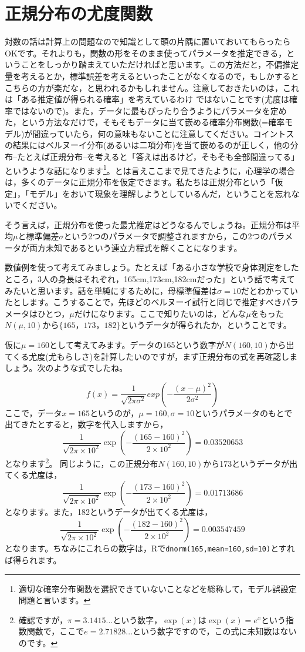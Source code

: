 \documentclass{ltjsbook}
\begin{document}
\section{正規分布の尤度関数}
対数の話は計算上の問題なので知識として頭の片隅に置いておいてもらったらOKです。それよりも，関数の形をそのまま使ってパラメータを推定できる，ということをしっかり踏まえていただければと思います。この方法だと，不偏推定量を考えるとか，標準誤差を考えるといったことがなくなるので，もしかするとこちらの方が楽だな，と思われるかもしれません。注意しておきたいのは，これは「ある推定値が得られる確率」を考えているわけ
ではないことです(尤度は確率ではないので)。また，データに最もぴったり合うようにパラメータを定めた，という方法なだけで，そもそもデータに当て嵌める確率分布関数(=確率モデル)が間違っていたら，何の意味もないことに注意してください。コイントスの結果にはベルヌーイ分布(あるいは二項分布)を当て嵌めるのが正しく，他の分布--たとえば正規分布--を考えると「答えは出るけど，そもそも全部間違ってる」というような話になります\footnote{適切な確率分布関数を選択できていないことなどを総称して，モデル誤設定問題と言います。}。とは言えここまで見てきたように，心理学の場合は，多くのデータに正規分布を仮定できます。私たちは正規分布という「仮定」，「モデル」をおいて現象を理解しようとしているんだ，ということを忘れないでください。

そう言えば，正規分布を使った最尤推定はどうなるんでしょうね。正規分布は平均$\mu$と標準偏差$\sigma$という2つのパラメータで調整されますから，この2つのパラメータが両方未知であるという連立方程式を解くことになります。

数値例を使って考えてみましょう。たとえば「ある小さな学校で身体測定をしたところ，3人の身長はそれぞれ，165cm,173cm,182cmだった」という話で考えてみたいと思います。話を単純にするために，母標準偏差は$\sigma=10$だとわかっていたとします。こうすることで，先ほどのベルヌーイ試行と同じで推定すべきパラメータはひとつ，$\mu$だけになります。ここで知りたいのは，どんな$\mu$をもった$N(\mu,10)$から$\{ 165，173，182\}$というデータが得られたか，ということです。

仮に$\mu=160$として考えてみます。データの165という数字が$N(160,10)$から出てくる尤度(尤もらしさ)を計算したいのですが，まず正規分布の式を再確認しましょう。次のような式でしたね。

\[ 	f(x)= \frac{1}{\sqrt{2\pi \sigma^2}} exp\left(-\frac{(x-\mu)^2}{2\sigma^2}\right) \]
ここで，データ$x=165$というのが，$\mu=160,\sigma=10$というパラメータのもとで出てきたとすると，数字を代入しますから，
\[ \frac{1}{\sqrt{2\pi \times 10^2}} \exp\left(-\frac{(165-160)^2}{2\times 10^2}\right) = 0.03520653 \]
となります\footnote{確認ですが，$\pi=3.1415...$という数字，$\exp(x)$は$\exp(x)= e^x$という指数関数で，ここで$e = 2.71828...$という数字ですので，この式に未知数はないのです。}。
同じように，この正規分布$N(160,10)$から173というデータが出てくる尤度は，
\[ \frac{1}{\sqrt{2\pi \times 10^2}} \exp\left(-\frac{(173-160)^2}{2\times 10^2}\right) = 0.01713686 \]
となります。また，182というデータが出てくる尤度は，
\[ \frac{1}{\sqrt{2\pi \times 10^2}} \exp\left(-\frac{(182-160)^2}{2\times 10^2}\right) = 0.003547459 \]
となります。ちなみにこれらの数字は，Rで\texttt{dnorm(165,mean=160,sd=10)}とすれば得られます。
\end{document}
